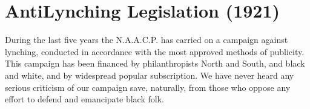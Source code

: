 \documentclass[letterpaper,10pt,english]{jupyterBook}
\begin{document}
\section{Anti\sphinxhyphen{}Lynching Legislation (1921)}
\label{\detokenize{Volumes/22/01/anti-lynching_legislation:anti-lynching-legislation-1921}}\label{\detokenize{Volumes/22/01/anti-lynching_legislation::doc}}
\ignorespaces 
{}\ignorespaces 
\sphinxAtStartPar
During the last five years the N.A.A.C.P. has carried on a campaign against lynching, conducted in accordance with the most approved methods of public­ity. This campaign has been financed by philanthropists North and South, and black and white, and by wide\sphinxhyphen{}spread popular subscription. We have never heard any serious criticism of our campaign save, naturally, from those who oppose any effort to defend and emancipate black folk.
\end{document}
